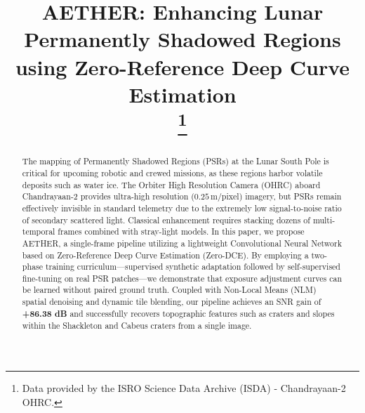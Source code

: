 \documentclass[conference]{IEEEtran}
\begin{document}
\title{AETHER: Enhancing Lunar Permanently Shadowed Regions using Zero-Reference Deep Curve Estimation\\
\thanks{Data provided by the ISRO Science Data Archive (ISDA) - Chandrayaan-2 OHRC.}
}

\author{
\and
{}
\and
{}
}

\maketitle

\begin{abstract}
The mapping of Permanently Shadowed Regions (PSRs) at the Lunar South Pole is critical for upcoming robotic and crewed missions, as these regions harbor volatile deposits such as water ice. The Orbiter High Resolution Camera (OHRC) aboard Chandrayaan-2 provides ultra-high resolution ($0.25$\,m/pixel) imagery, but PSRs remain effectively invisible in standard telemetry due to the extremely low signal-to-noise ratio of secondary scattered light. Classical enhancement requires stacking dozens of multi-temporal frames combined with stray-light models. In this paper, we propose AETHER, a single-frame pipeline utilizing a lightweight Convolutional Neural Network based on Zero-Reference Deep Curve Estimation (Zero-DCE). By employing a two-phase training curriculum—supervised synthetic adaptation followed by self-supervised fine-tuning on real PSR patches—we demonstrate that exposure adjustment curves can be learned without paired ground truth. Coupled with Non-Local Means (NLM) spatial denoising and dynamic tile blending, our pipeline achieves an SNR gain of \textbf{+86.38 dB} and successfully recovers topographic features such as craters and slopes within the Shackleton and Cabeus craters from a single image.
\end{abstract}
\end{document}

